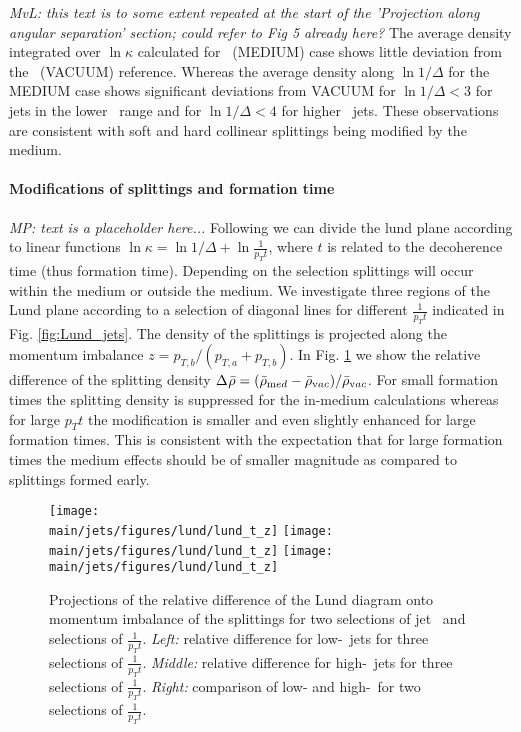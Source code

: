 \textit{MvL: this text is to some extent repeated at the start of the 'Projection along angular separation' section; could refer to Fig 5 already here?}
The average density integrated over $\ln \kappa$ calculated for \PbPb\ (MEDIUM) case shows little deviation from the \pp\ (VACUUM) reference.
Whereas the average density along $\ln 1/\Delta$ for the MEDIUM case shows significant deviations from VACUUM for $\ln 1/\Delta < 3$ for jets in the lower \pt\ range and for $\ln 1/\Delta < 4$ for higher \pt\ jets.
These observations are consistent with soft and hard collinear splittings being modified by the medium.

\paragraph{Modifications of splittings and formation time}

{\it MP: text is a placeholder here...}
Following \cite{Andrews:2018jcm} we can divide the lund plane according to linear functions $\ln\kappa = \ln1/\Delta + \ln \frac{1}{p_{T} t}$, where $t$ is related to the decoherence time (thus formation time).
Depending on the selection splittings will occur within the medium or outside the medium.
We investigate three regions of the Lund plane according to a selection of diagonal lines for different $\frac{1}{p_{T} t}$ indicated in Fig. \ref{fig:Lund_jets}.
The density of the splittings is projected along the momentum imbalance $z = p_{T,b}/(p_{T,a} + p_{T,b})$.
In Fig. \ref{fig:Lund_projections_z} we show the relative difference of the splitting density $\Delta_{\rm}\bar{\rho} = (\bar{\rho}_{\mathrm med} - \bar{\rho}_{\mathrm vac})/\bar{\rho}_{\mathrm vac}$.
For small formation times the splitting density is suppressed for the in-medium calculations whereas for large $p_{T} t$ the modification is smaller and even slightly enhanced for large formation times.
This is consistent with the expectation that for large formation times the medium effects should be of smaller magnitude as compared to splittings formed early.



\begin{figure}[htbp]
	\centering
	\texttt{[image: \\main/jets/figures/lund/lund\_t\_z]}
	\texttt{[image: \\main/jets/figures/lund/lund\_t\_z]}
	\texttt{[image: \\main/jets/figures/lund/lund\_t\_z]}
	\caption{Projections of the relative difference of the Lund diagram onto momentum imbalance of the splittings for two selections of jet \pt\ and selections of $\frac{1}{p_{T} t}$.
	{\it Left:} relative difference for low-\pt\ jets for three selections of $\frac{1}{p_{T} t}$.
	{\it Middle:} relative difference for high-\pt\ jets for three selections of $\frac{1}{p_{T} t}$.
	{\it Right:} comparison of low- and high-\pt\ for two selections of $\frac{1}{p_{T} t}$.
	}
	\label{fig:Lund_projections_z}
\end{figure}

